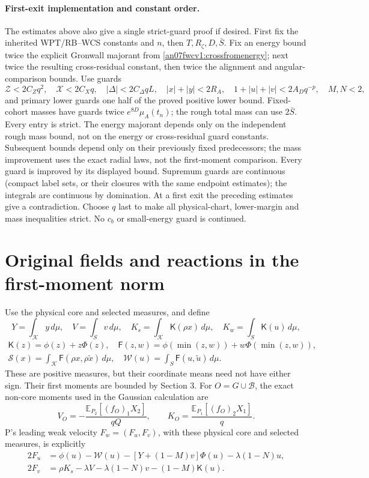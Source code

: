 \documentclass[11pt]{article}
\numberwithin{equation}{section}
\newcommand{\E}{\mathbb E}\newcommand{\dd}{\,d}
\newcommand{\KK}{\mathcal K}\newcommand{\BB}{\mathcal B}
\newcommand{\Kfun}{\mathsf K}\newcommand{\Ffun}{\mathsf F}
\begin{document}
\paragraph{First-exit implementation and constant order.}
The estimates above also give a single strict-guard proof if desired.
First fix the inherited WPT/RB--WCS constants and \(n\), then
\(T,R_\zeta,D,\bar S\). Fix an energy bound twice the explicit
Gronwall majorant from \eqref{an07fwcv1:crossfromenergy}; next
twice the resulting cross-residual constant, then twice the
alignment and angular-comparison bounds. Use guards
\[
 \mathcal Z<2C_Zq^2,\quad \mathcal X<2C_Xq,\quad
 |\Delta|<2C_\Delta qL,\quad
 |x|+|y|<2R_A,\quad 1+|u|+|v|<2A_Dq^{-p},
 \quad M,N<2,
\]
and primary lower guards one half of the proved positive lower
bound. Fixed-cohort masses have guards twice
\(e^{8D}\mu_A(t_n)\); the rough total mass can use
\(2\bar S\). Every entry is strict. The energy majorant depends
only on the independent rough mass bound, not on the energy or
cross-residual guard constants. Subsequent bounds depend only
on their previously fixed predecessors; the mass improvement
uses the exact radial laws, not the first-moment comparison.
Every guard is improved by its displayed bound. Supremum guards
are continuous (compact label sets, or their closures with the same
endpoint estimates); the integrals are continuous by domination.
At a first exit the preceding estimates give a contradiction.
Choose \(q\) last to make all physical-chart, lower-margin and
mass inequalities strict. No \(c_b\) or small-energy guard is
continued.

\section{Original fields and reactions in the first-moment norm}
\label{an07fwcv1:reduction}
Use the physical core and selected measures, and define
\[
 Y=\int_\KK y\dd\mu,\quad V=\int_S v\dd\mu,\quad
 K_s=\int_\KK\Kfun(\rho x)\dd\mu,\quad K_w=\int_S\Kfun(u)\dd\mu,
\]
\[
 \begin{gathered}
 \Kfun(z)=\phi(z)+z\Phi(z),\quad
 \Ffun(z,w)=\phi(\min(z,w))+w\Phi(\min(z,w)),\\
 \mathcal S(x)=\int_\KK\Ffun(\rho x,\rho\widetilde x)\dd\mu,
 \quad\mathcal W(u)=\int_S\Ffun(u,\widetilde u)\dd\mu.
 \end{gathered}
\]
These are positive measures, but their coordinate means need not
have either sign. Their first moments are bounded by Section 3.
For \(O=G\cup\BB\), the exact non-core moments used in the
Gaussian calculation are
\[
 V_O=-\frac{\E_{P_2}[(f_O)_1X_2]}{qQ},\qquad
 K_O=\frac{\E_{P_1}[(f_O)_2X_1]}q.
\]
P's leading weak velocity \(F_w=(F_u,F_v)\), with these
physical core and selected measures, is explicitly
\begin{align*}
 2F_u&=\phi(u)-\mathcal W(u)-[Y+(1-M)v]\Phi(u)
                  -\lambda(1-N)u,\\
 2F_v&=\rho K_s-\lambda V-\lambda(1-N)v-(1-M)\Kfun(u).
\end{align*}
\end{document}
